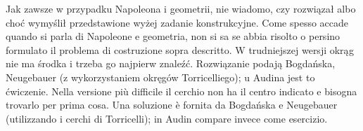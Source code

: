 Jak zawsze w przypadku Napoleona i geometrii, nie wiadomo, czy rozwiązał albo choć wymyślił przedstawione wyżej zadanie konstrukcyjne. %
Come spesso accade quando si parla di Napoleone e geometria, non si sa se abbia risolto o persino formulato il problema di costruzione sopra descritto. %
%
W trudniejszej wersji okrąg nie ma środka i trzeba go najpierw znaleźć. %
Rozwiązanie podają Bogdańska, Neugebauer \cite[s. 116]{neugebauer_2018} (z wykorzystaniem okręgów Torricelliego); %
u Audina \cite[s. 105]{audin_2003} jest to ćwiczenie. %
Nella versione più difficile il cerchio non ha il centro indicato e bisogna trovarlo per prima cosa. %
Una soluzione è fornita da Bogdańska e Neugebauer \cite[p. 116]{neugebauer_2018} (utilizzando i cerchi di Torricelli); %
in Audin \cite[p. 105]{audin_2003} compare invece come esercizio. %
%

%
